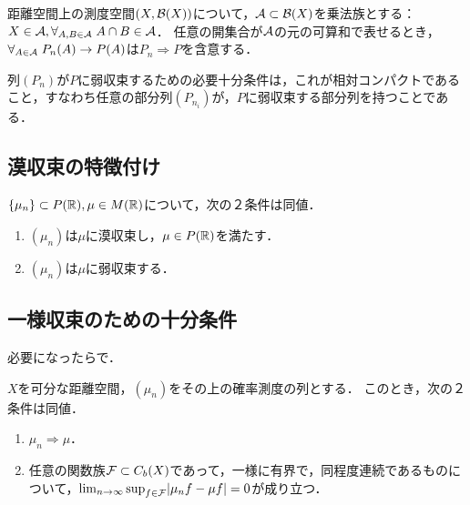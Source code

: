 \documentclass[uplatex,dvipdfmx]{jsreport}
\begin{document}
\begin{theorem}[その他の集合族による特徴付け]
    距離空間上の測度空間$(X,\mathcal{B}(X))$について，$\mathcal{A}\subset\mathcal{B}(X)$を乗法族とする：$X\in\mathcal{A},\forall_{A,B\in\mathcal{A}}\;A\cap B\in\mathcal{A}$．
    任意の開集合が$\mathcal{A}$の元の可算和で表せるとき，$\forall_{A\in\mathcal{A}}\;P_n(A)\to P(A)$は$P_n\Rightarrow P$を含意する．
\end{theorem}

\begin{theorem}[３つ目の特徴付け]
    列$(P_n)$が$P$に弱収束するための必要十分条件は，これが相対コンパクトであること，すなわち任意の部分列$(P_{n_i})$が，$P$に弱収束する部分列を持つことである．
\end{theorem}

\subsection{漠収束の特徴付け}

\begin{proposition}[漠収束の特徴付け]\label{prop-characterization-of-value-convergence}
    $\{\mu_n\}\subset P(\mathbb{R}),\mu\in M(\mathbb{R})$について，次の２条件は同値．
    \begin{enumerate}
        \item $(\mu_n)$は$\mu$に漠収束し，$\mu\in P(\mathbb{R})$を満たす．
        \item $(\mu_n)$は$\mu$に弱収束する．
    \end{enumerate}
\end{proposition}

\subsection{一様収束のための十分条件}

\begin{tcolorbox}[colframe=ForestGreen, colback=ForestGreen!10!white,breakable,colbacktitle=ForestGreen!40!white,coltitle=black,fonttitle=\bfseries\sffamily,
title=]
    必要になったらで．
\end{tcolorbox}

\begin{theorem}
    $X$を可分な距離空間，$(\mu_n)$をその上の確率測度の列とする．
    このとき，次の２条件は同値．
    \begin{enumerate}
        \item $\mu_n\Rightarrow\mu$．
        \item 任意の関数族$\mathcal{F}\subset C_b(X)$であって，一様に有界で，同程度連続であるものについて，$\lim_{n\to\infty}\sup_{f\in\mathcal{F}}\lvert\mu_nf-\mu f\rvert=0$が成り立つ．
    \end{enumerate}
\end{theorem}
\end{document}
